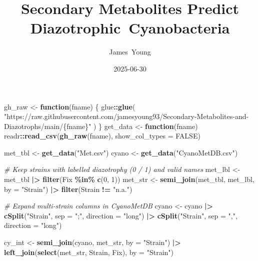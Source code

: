 \documentclass[
]{article}
\title{Secondary Metabolites Predict Diazotrophic~Cyanobacteria}
\author{James~Young}
\date{2025-06-30}
\newenvironment{Shaded}{\begin{snugshade}}{\end{snugshade}}
\newcommand{\AttributeTok}[1]{\textcolor[rgb]{0.13,0.29,0.53}{#1}}
\newcommand{\CommentTok}[1]{\textcolor[rgb]{0.56,0.35,0.01}{\textit{#1}}}
\newcommand{\ConstantTok}[1]{\textcolor[rgb]{0.56,0.35,0.01}{#1}}
\newcommand{\ControlFlowTok}[1]{\textcolor[rgb]{0.13,0.29,0.53}{\textbf{#1}}}
\newcommand{\DecValTok}[1]{\textcolor[rgb]{0.00,0.00,0.81}{#1}}
\newcommand{\FunctionTok}[1]{\textcolor[rgb]{0.13,0.29,0.53}{\textbf{#1}}}
\newcommand{\NormalTok}[1]{#1}
\newcommand{\OtherTok}[1]{\textcolor[rgb]{0.56,0.35,0.01}{#1}}
\newcommand{\SpecialCharTok}[1]{\textcolor[rgb]{0.81,0.36,0.00}{\textbf{#1}}}
\newcommand{\StringTok}[1]{\textcolor[rgb]{0.31,0.60,0.02}{#1}}
\begin{document}
\maketitle

\begin{Shaded}
\begin{Highlighting}[]
\NormalTok{gh\_raw }\OtherTok{\textless{}{-}} \ControlFlowTok{function}\NormalTok{(fname) \{}
\NormalTok{  glue}\SpecialCharTok{::}\FunctionTok{glue}\NormalTok{(}
    \StringTok{"https://raw.githubusercontent.com/jamesyoung93/Secondary{-}Metabolites{-}and{-}Diazotrophs/main/\{fname\}"}
\NormalTok{  )}
\NormalTok{\}}
\NormalTok{get\_data }\OtherTok{\textless{}{-}} \ControlFlowTok{function}\NormalTok{(fname) readr}\SpecialCharTok{::}\FunctionTok{read\_csv}\NormalTok{(}\FunctionTok{gh\_raw}\NormalTok{(fname), }\AttributeTok{show\_col\_types =} \ConstantTok{FALSE}\NormalTok{)}

\NormalTok{met\_tbl }\OtherTok{\textless{}{-}} \FunctionTok{get\_data}\NormalTok{(}\StringTok{"Met.csv"}\NormalTok{)}
\NormalTok{cyano   }\OtherTok{\textless{}{-}} \FunctionTok{get\_data}\NormalTok{(}\StringTok{"CyanoMetDB.csv"}\NormalTok{)}

\CommentTok{\# Keep strains with labelled diazotrophy (0 / 1) and valid names}
\NormalTok{met\_lbl }\OtherTok{\textless{}{-}}\NormalTok{ met\_tbl }\SpecialCharTok{|\textgreater{}} \FunctionTok{filter}\NormalTok{(Fix }\SpecialCharTok{\%in\%} \FunctionTok{c}\NormalTok{(}\DecValTok{0}\NormalTok{, }\DecValTok{1}\NormalTok{))}
\NormalTok{met\_str }\OtherTok{\textless{}{-}} \FunctionTok{semi\_join}\NormalTok{(met\_tbl, met\_lbl, }\AttributeTok{by =} \StringTok{"Strain"}\NormalTok{) }\SpecialCharTok{|\textgreater{}} \FunctionTok{filter}\NormalTok{(Strain }\SpecialCharTok{!=} \StringTok{"n.a."}\NormalTok{)}

\CommentTok{\# Expand multi‑strain columns in CyanoMetDB}
\NormalTok{cyano }\OtherTok{\textless{}{-}}\NormalTok{ cyano }\SpecialCharTok{|\textgreater{}}
  \FunctionTok{cSplit}\NormalTok{(}\StringTok{"Strain"}\NormalTok{, }\AttributeTok{sep =} \StringTok{";"}\NormalTok{, }\AttributeTok{direction =} \StringTok{"long"}\NormalTok{) }\SpecialCharTok{|\textgreater{}}
  \FunctionTok{cSplit}\NormalTok{(}\StringTok{"Strain"}\NormalTok{, }\AttributeTok{sep =} \StringTok{","}\NormalTok{, }\AttributeTok{direction =} \StringTok{"long"}\NormalTok{)}

\NormalTok{cy\_int }\OtherTok{\textless{}{-}} \FunctionTok{semi\_join}\NormalTok{(cyano, met\_str, }\AttributeTok{by =} \StringTok{"Strain"}\NormalTok{) }\SpecialCharTok{|\textgreater{}}
  \FunctionTok{left\_join}\NormalTok{(}\FunctionTok{select}\NormalTok{(met\_str, Strain, Fix), }\AttributeTok{by =} \StringTok{"Strain"}\NormalTok{)}


\end{Highlighting}
\end{Shaded}
\end{document}
